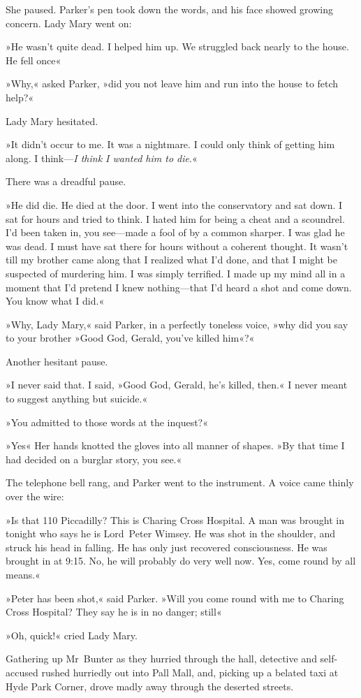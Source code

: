 She paused. Parker's pen took down the words, and his face showed growing concern. Lady Mary went on:

»He wasn't quite dead. I helped him up. We struggled back nearly to the house. He fell once\longdash«

»Why,« asked Parker, »did you not leave him and run into the house to fetch help?«

Lady Mary hesitated.

»It didn't occur to me. It was a nightmare. I could only think of getting him along. I think—\textit{I think I wanted him to die}.«

There was a dreadful pause.

»He did die. He died at the door. I went into the conservatory and sat down. I sat for hours and tried to think. I hated him for being a cheat and a scoundrel. I'd been taken in, you see—made a fool of by a common sharper. I was glad he was dead. I must have sat there for hours without a coherent thought. It wasn't till my brother came along that I realized what I'd done, and that I might be suspected of murdering him. I was simply terrified. I made up my mind all in a moment that I'd pretend I knew nothing—that I'd heard a shot and come down. You know what I did.«

»Why, Lady Mary,« said Parker, in a perfectly toneless voice, »why did you say to your brother »Good God, Gerald, you've killed him«?«

Another hesitant pause.

»I never said that. I said, »Good God, Gerald, he's killed, then.« I never meant to suggest anything but suicide.«

»You admitted to those words at the inquest?«

»Yes\longdash« Her hands knotted the gloves into all manner of shapes. »By that time I had decided on a burglar story, you see.«

The telephone bell rang, and Parker went to the instrument. A voice came thinly over the wire:

»Is that 110 Piccadilly? This is Charing Cross Hospital. A man was brought in tonight who says he is Lord~Peter Wimsey. He was shot in the shoulder, and struck his head in falling. He has only just recovered consciousness. He was brought in at 9:15. No, he will probably do very well now. Yes, come round by all means.«

»Peter has been shot,« said Parker. »Will you come round with me to Charing Cross Hospital? They say he is in no danger; still\longdash«

»Oh, quick!« cried Lady Mary.

Gathering up Mr~Bunter as they hurried through the hall, detective and self-accused rushed hurriedly out into Pall Mall, and, picking up a belated taxi at Hyde Park Corner, drove madly away through the deserted streets.
